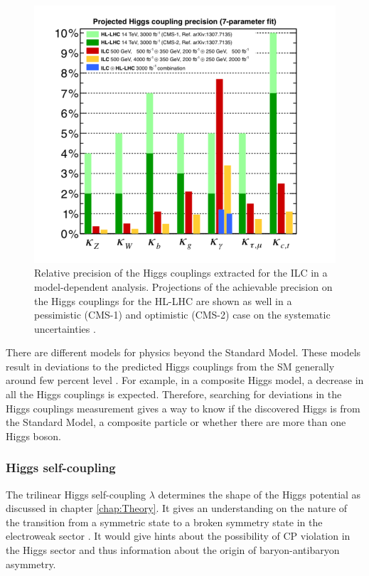 \begin{figure}[htbp]
  \centering
  \includegraphics[width=0.7\linewidth]{chap2/fig/HiggsCouplings_LHCComp.png}
  \caption{Relative precision of the Higgs couplings extracted for the ILC in a model-dependent analysis. Projections of the achievable precision on the Higgs couplings for the HL-LHC are shown as well in a pessimistic (CMS-1) and optimistic (CMS-2) case on the systematic uncertainties \cite{Fujii:2015jha}.}  \label{fig:HiggsCouplings}
\end{figure}

There are different models for physics beyond the Standard Model. These models result in deviations to the predicted Higgs couplings from the SM generally around few percent level \cite{Gupta:2012mi}. For example, in a composite Higgs model, a decrease in all the Higgs couplings is expected. Therefore, searching for deviations in the Higgs couplings measurement gives a way to know if the discovered Higgs is from the Standard Model, a composite particle or whether there are more than one Higgs boson.

\subsubsection{Higgs self-coupling}

The trilinear Higgs self-coupling $\lambda$ determines the shape of the Higgs potential as discussed in chapter \ref{chap:Theory}. It gives an understanding on the nature of the transition from a symmetric state to a broken symmetry state in the electroweak sector \cite{Kajantie:1996mn}. It would give hints about the possibility of CP violation in the Higgs sector and thus information about the origin of baryon-antibaryon asymmetry.

